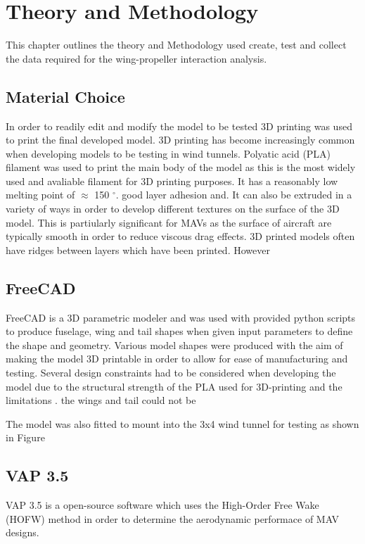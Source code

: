 \graphicspath{{./Figs/}}

\chapter{Theory and Methodology}
This chapter outlines the theory and Methodology used create, test and collect the data required for the wing-propeller interaction analysis. 

\section{Material Choice}
In order to readily edit and modify the model to be tested 3D printing was used to print the final developed model. 3D printing has become increasingly common when developing models to be testing in wind tunnels. Polyatic acid (PLA) filament was used to print the main body of the model as this is the most widely used and avaliable filament for 3D printing purposes. It has a reasonably low melting point of $\approx$ 150 $^{\circ}$. good layer adhesion and. It can also be extruded in a variety of ways in order to develop different textures on the surface of the 3D model. This is partiularly significant for MAVs as the surface of aircraft are typically smooth in order to reduce viscous drag effects. 3D printed models often have ridges between layers which have been printed. However 


\section{FreeCAD}
FreeCAD is a 3D parametric modeler and was used with provided python scripts to produce fuselage, wing and tail shapes when given input parameters to define the shape and geometry. Various model shapes were produced with the aim of making the model 3D printable in order to allow for ease of manufacturing and testing. Several design constraints had to be considered when developing the model due to the structural strength of the PLA used for 3D-printing and the limitations . the wings and tail could not be 

The model was also fitted to mount into the 3x4 wind tunnel for testing as shown in Figure 

\section{VAP 3.5}
VAP 3.5 is a open-source software which uses the High-Order Free Wake (HOFW)  method in order to determine the aerodynamic performace of MAV designs. \\


